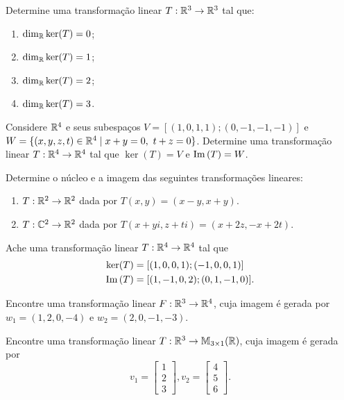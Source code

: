 \documentclass[12pt]{exam}
\begin{document}
\begin{exercicio}
  Determine uma transforma\c{c}\~ao linear $T : \mathbb{R}^3 \to \mathbb{R}^3$ tal que:
  \begin{enumerate}[label={\alph*})]
    \item $\dim_{\mathbb{R}} \ker(T) = 0$;

    \item $\dim_{\mathbb{R}} \ker(T) = 1$;

    \item $\dim_{\mathbb{R}} \ker(T) = 2$;

    \item $\dim_{\mathbb{R}} \ker(T) = 3$.
  \end{enumerate}
\end{exercicio}

\begin{exercicio}
  Considere $\mathbb{R}^4$ e seus subespa\c{c}os $V = [(1,0,1,1);(0,-1,-1,-1)]$ e $W = \{(x,y,z,t) \in \mathbb{R}^4 \mid x + y = 0,\ t + z = 0\}$. Determine uma transforma\c{c}\~ao linear $T : \mathbb{R}^4 \to \mathbb{R}^4$ tal que $\ker(T) = V$ e ${\rm Im\,}(T) = W$.
\end{exercicio}

\begin{exercicio}
  Determine o n\'ucleo e a imagem das seguintes transforma\c{c}\~oes lineares:
  \begin{enumerate}[label={\alph*})]
    \item $T : \mathbb{R}^2 \to \mathbb{R}^2$ dada por $T(x,y) = (x - y, x + y)$.

    \item $T : \mathbb{C}^2 \to \mathbb{R}^2$ dada por $T(x + yi,z + ti) = (x + 2z, -x + 2t)$.
  \end{enumerate}
\end{exercicio}

\begin{exercicio}
  Ache uma transforma\c{c}\~ao linear $T : \mathbb{R}^4 \to \mathbb{R}^4$ tal que
  \begin{align*}
    \ker(T) &= [(1,0,0,1);(-1,0,0,1)]\\
    {\rm Im\,}(T) &= [(1,-1,0,2);(0,1,-1,0)].
  \end{align*}
\end{exercicio}

\begin{exercicio}
  Encontre uma transforma\c{c}\~ao linear $F : \mathbb{R}^3 \to \mathbb{R}^4$, cuja imagem \'e gerada por $w_1 = (1,2,0,-4)$ e $w_2 = (2,0,-1,-3)$.
\end{exercicio}

\begin{exercicio}
  Encontre uma transforma\c{c}\~ao linear $T : \mathbb{R}^3 \to \mathbb{M}_{3 \times 1}(\mathbb{R})$, cuja imagem \'e gerada por
  \[
        v_1 = \begin{bmatrix}
                1\\2\\3
              \end{bmatrix},
        v_2 = \begin{bmatrix}
                 4\\5\\6
              \end{bmatrix}.
  \]
\end{exercicio}
\end{document}
